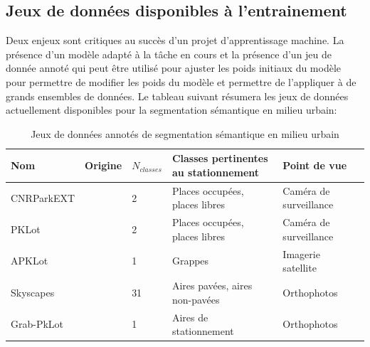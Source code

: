   \subsection{Jeux de données disponibles à l'entrainement}
    Deux enjeux sont critiques au succès d'un projet d'apprentissage machine. La présence d'un modèle adapté à la tâche en cours et la présence d'un jeu de donnée annoté qui peut être utilisé pour ajuster les poids initiaux du modèle pour permettre de modifier les poids du modèle et permettre de l'appliquer à de grands ensembles de données. Le tableau suivant résumera les jeux de données actuellement disponibles pour la segmentation sémantique en milieu urbain:
    \begin{table}
      \centering
          \begin{tabular}{l p{} l p{}  p{} l} 
          \hline
          Nom & Origine & $N_{classes}$ & Classes pertinentes au stationnement & Point de vue\\
          \hline
          CNRParkEXT & \cite{Amato:DeepLearning:2017} & 2 & Places occupées, places libres & Caméra de surveillance \\
          PKLot & \cite{deAlmeida:PKLotRobust:2015} & 2 & Places occupées, places libres & Caméra de surveillance \\
          APKLot & \cite{Hurst-Tarrab:RobustParking:2020} & 1 & Grappes & Imagerie satellite\\
          Skyscapes & \cite{Azimi:SkyScapesFineGrained:2019} & 31 & Aires pavées, aires non-pavées & Orthophotos\\
          Grab-PkLot & \cite{Yin:ContextenrichedSatellite:2022} & 1 & Aires de stationnement & Orthophotos\\
          \hline
        \end{tabular}
        \caption{Jeux de données annotés de segmentation sémantique en milieu urbain}
        \label{tab:jeux_donnees_segmentation_urbain}
    \end{table}
    \FloatBarrier
